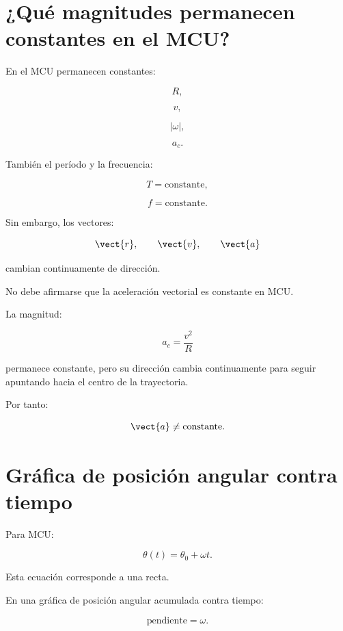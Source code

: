 \section{¿Qué magnitudes permanecen constantes en el MCU?}

En el MCU permanecen constantes:

\[
R,
\]

\[
v,
\]

\[
|\omega|,
\]

\[
a_c.
\]

También el período y la frecuencia:

\[
T=\text{constante},
\]

\[
f=\text{constante}.
\]

Sin embargo, los vectores:

\[
\vect{r},
\qquad
\vect{v},
\qquad
\vect{a}
\]

cambian continuamente de dirección.

\begin{errorfrecuente}

No debe afirmarse que la aceleración vectorial es constante en MCU.

La magnitud:

\[
a_c=\frac{v^2}{R}
\]

permanece constante, pero su dirección cambia continuamente para seguir
apuntando hacia el centro de la trayectoria.

Por tanto:

\[
\vect{a}\neq\text{constante}.
\]

\end{errorfrecuente}


\section{Gráfica de posición angular contra tiempo}

Para MCU:

\[
\theta(t)=\theta_0+\omega t.
\]

Esta ecuación corresponde a una recta.

En una gráfica de posición angular acumulada contra tiempo:

\[
\boxed{
\text{pendiente}=\omega
}.
\]

\begin{center}
\end{center}

